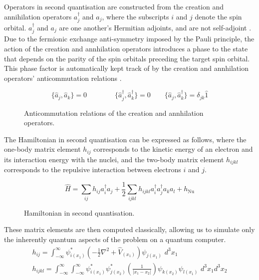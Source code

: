 Operators in second quantisation are constructed from the creation and annihilation operators $a_j^\dagger$ and $a_j$, where the subscripts $i$ and $j$ denote the spin orbital. $a_j^\dagger$ and $a_j$ are one another's Hermitian adjoints, and are not self-adjoint \cite{Helgaker2000}. Due to the fermionic exchange anti-symmetry imposed by the Pauli principle, the action of the creation and annhilation operators introduces a phase to the state that depends on the parity of the spin orbitals preceding the target spin orbital. This phase factor is automatically kept track of by the creation and annhilation operators' anticommutation relations \cite{Helgaker2000}.

\begin{figure}[H]
    \centering
    \begin{equation*}
        \{ \hat a_{j}, \hat a_{k} \} = 0 \qquad \qquad
        \{ \hat a_{j}^{\dagger}, \hat a_{k}^{\dagger} \} = 0 \qquad
        \{ \hat a_{j}, \hat a_{k}^{\dagger} \} = \delta_{jk} \hat{1}
    \end{equation*}
    \caption{Anticommutation relations of the creation and annhilation operators.}
    \label{anticommutation-relations}
\end{figure}

The Hamiltonian in second quantisation can be expressed as follows, where the one-body matrix element $h_{ij}$ corresponds to the kinetic energy of an electron and its interaction energy with the nuclei, and the two-body matrix element $h_{ijkl}$ corresponds to the repulsive interaction between electrons $i$ and $j$.

\begin{figure}[H]
    \centering
    \begin{equation*}
        \hat H =
        \sum_{ij} h_{ij} a^\dagger_i a_j +
        \frac{1}{2} \sum_{ijkl} h_{ijkl} a^\dagger_i a^\dagger_j a_k a_l +
        h_\text{Nu}
    \end{equation*}
    \caption{Hamiltonian in second quantisation.}
    \label{hamiltonian}
\end{figure}

These matrix elements are then computed classically, allowing us to simulate only the inherently quantum aspects of the problem on a quantum computer.
\begin{gather*}
h_{ij} = \int^\infty_{-\infty} \psi^*_{i(x_1)} \left( - \frac{1}{2} \nabla^2 + \hat V_{(x_1)} \right) \psi_{j(x_1)} \,\, d^3 x_1 \\[4ex]
%
h_{ijkl} = \int^\infty_{-\infty} \int^\infty_{-\infty} \psi^*_{i(x_1)} \psi^*_{j(x_2)} \left( \frac{1}{|x_1 - x_2|} \right) \psi_{k(x_2)} \psi_{l(x_1)} \,\, d^3 x_1 d^3 x_2
\end{gather*}

